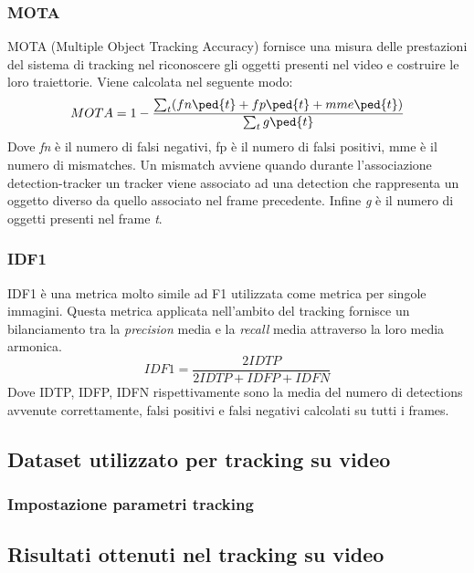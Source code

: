 \subsubsection{MOTA}
MOTA (Multiple Object Tracking Accuracy) fornisce una misura delle prestazioni del sistema di tracking nel riconoscere gli oggetti presenti nel video e costruire le loro traiettorie. Viene calcolata nel seguente modo:
\[
MOTA = 1-\frac{\sum_{t}^{}(fn\ped{t}+fp\ped{t}+mme\ped{t})}{\sum_{t}^{}g\ped{t}}
\]
Dove \textit{fn} è il numero di falsi negativi, fp è il numero di falsi positivi, mme è il numero di mismatches. Un mismatch avviene quando durante l'associazione detection-tracker un tracker viene associato ad una detection che rappresenta un oggetto diverso da quello associato nel frame precedente. Infine  \textit{g} è il numero di oggetti presenti nel frame \textit{t}.
\subsubsection{IDF1}
IDF1 è una metrica molto simile ad F1 utilizzata come metrica per singole immagini. Questa metrica applicata nell'ambito del tracking fornisce un bilanciamento tra la \textit{precision} media e la \textit{recall} media attraverso la loro media armonica. 
\[
IDF1 = \frac{2IDTP}{2IDTP+IDFP+IDFN}
\]
Dove IDTP, IDFP, IDFN rispettivamente sono la media del numero di detections avvenute correttamente, falsi positivi e falsi negativi calcolati su tutti i frames. 

\subsection{Dataset utilizzato per tracking su video}

\subsubsection{Impostazione parametri tracking}


\subsection{Risultati ottenuti nel tracking su video}